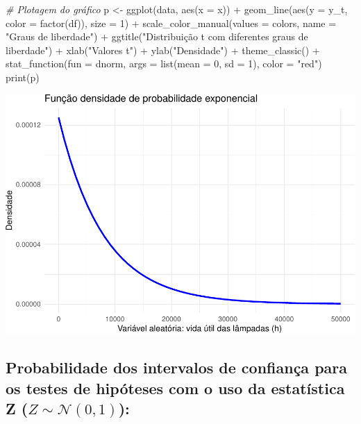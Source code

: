 \documentclass[
]{book}
\newenvironment{Shaded}{\begin{snugshade}}{\end{snugshade}}
\newcommand{\AttributeTok}[1]{\textcolor[rgb]{0.77,0.63,0.00}{#1}}
\newcommand{\CommentTok}[1]{\textcolor[rgb]{0.56,0.35,0.01}{\textit{#1}}}
\newcommand{\DecValTok}[1]{\textcolor[rgb]{0.00,0.00,0.81}{#1}}
\newcommand{\FunctionTok}[1]{\textcolor[rgb]{0.00,0.00,0.00}{#1}}
\newcommand{\NormalTok}[1]{#1}
\newcommand{\OtherTok}[1]{\textcolor[rgb]{0.56,0.35,0.01}{#1}}
\newcommand{\SpecialCharTok}[1]{\textcolor[rgb]{0.00,0.00,0.00}{#1}}
\newcommand{\StringTok}[1]{\textcolor[rgb]{0.31,0.60,0.02}{#1}}
\begin{document}
\begin{Shaded}
\begin{Highlighting}[]
\CommentTok{\# Plotagem do gráfico}
\NormalTok{p }\OtherTok{\textless{}{-}} \FunctionTok{ggplot}\NormalTok{(data, }\FunctionTok{aes}\NormalTok{(}\AttributeTok{x =}\NormalTok{ x)) }\SpecialCharTok{+}
  \FunctionTok{geom\_line}\NormalTok{(}\FunctionTok{aes}\NormalTok{(}\AttributeTok{y =}\NormalTok{ y\_t, }\AttributeTok{color =} \FunctionTok{factor}\NormalTok{(df)), }\AttributeTok{size =} \DecValTok{1}\NormalTok{) }\SpecialCharTok{+}
  \FunctionTok{scale\_color\_manual}\NormalTok{(}\AttributeTok{values =}\NormalTok{ colors, }\AttributeTok{name =} \StringTok{"Graus de liberdade"}\NormalTok{) }\SpecialCharTok{+}
  \FunctionTok{ggtitle}\NormalTok{(}\StringTok{"Distribuição t com diferentes graus de liberdade"}\NormalTok{) }\SpecialCharTok{+}
  \FunctionTok{xlab}\NormalTok{(}\StringTok{"Valores t"}\NormalTok{) }\SpecialCharTok{+}
  \FunctionTok{ylab}\NormalTok{(}\StringTok{"Densidade"}\NormalTok{) }\SpecialCharTok{+}
  \FunctionTok{theme\_classic}\NormalTok{() }\SpecialCharTok{+}
  \FunctionTok{stat\_function}\NormalTok{(}\AttributeTok{fun =}\NormalTok{ dnorm, }\AttributeTok{args =} \FunctionTok{list}\NormalTok{(}\AttributeTok{mean =} \DecValTok{0}\NormalTok{, }\AttributeTok{sd =} \DecValTok{1}\NormalTok{), }\AttributeTok{color =} \StringTok{"red"}\NormalTok{)}
\FunctionTok{print}\NormalTok{(p)}
\end{Highlighting}
\end{Shaded}

\includegraphics{apostila_files/figure-latex/unnamed-chunk-119-1.pdf}

\hfill\break

\hypertarget{probabilidade-dos-intervalos-de-confianuxe7a-para-os-testes-de-hipuxf3teses-com-o-uso-da-estatuxedstica-z-z-sim-mathcaln01}{%
\subsection{\texorpdfstring{Probabilidade dos intervalos de confiança para os testes de hipóteses com o uso da estatística Z (\(Z \sim \mathcal{N}(0,1)\)):}{Probabilidade dos intervalos de confiança para os testes de hipóteses com o uso da estatística Z (Z \textbackslash sim \textbackslash mathcal\{N\}(0,1)):}}\label{probabilidade-dos-intervalos-de-confianuxe7a-para-os-testes-de-hipuxf3teses-com-o-uso-da-estatuxedstica-z-z-sim-mathcaln01}}
\end{document}
